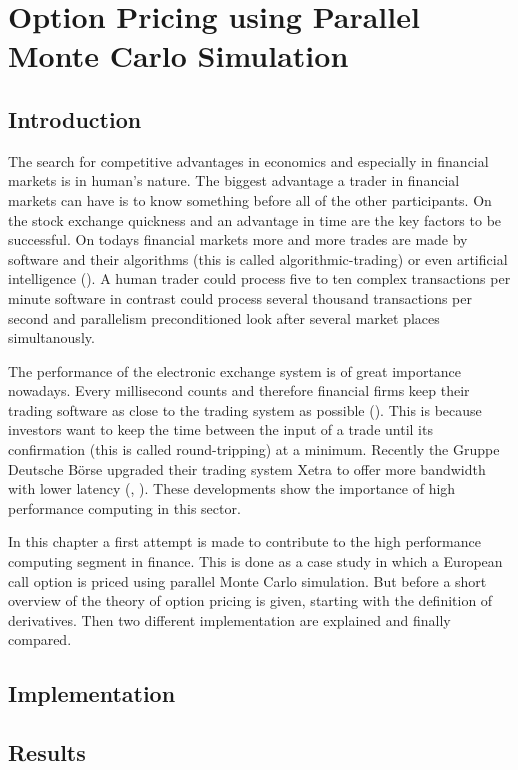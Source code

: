 \chapter{Option Pricing using Parallel Monte Carlo Simulation}
\label{chap:options}
\section{Introduction}
\label{sec:optionintro}

The search for competitive advantages in economics and especially in
financial markets is in human's nature. The biggest advantage a trader
in financial markets can have is to know something before all of the
other participants. On the stock exchange quickness and an advantage
in time are the key factors to be successful. On todays financial
markets more and more trades are made by software and their
algorithms (this is called algorithmic-trading) or even artificial
intelligence (\cite{bloomberg:hal9000}). A human trader could
process five to ten complex 
transactions per minute software in contrast could process several
thousand transactions per second and parallelism preconditioned look
after several market places simultanously.


The performance of the electronic exchange system is of great
importance nowadays. Every millisecond counts and therefore financial
firms keep their trading software as close to the trading system as
possible (\cite{wstonline:cuttingedge}). This is because investors
want to keep the time
between the input of a trade until its confirmation (this is called
round-tripping) at a minimum. Recently the Gruppe Deutsche B\"orse
upgraded their trading 
system Xetra to offer more bandwidth with lower latency (\cite{gdb:latency},
\cite{gdb:bandwidth}).
These developments show the importance of high performance computing
in this sector.


In this chapter a first attempt is made to contribute to the high performance
computing segment in finance. This is done as a case study in which a
European call option is priced using parallel Monte Carlo
simulation. But before a short overview of the theory of option
pricing is given, starting with the definition of derivatives. Then
two different implementation are explained and finally compared.



%
\section{Implementation}
\section{Results}

